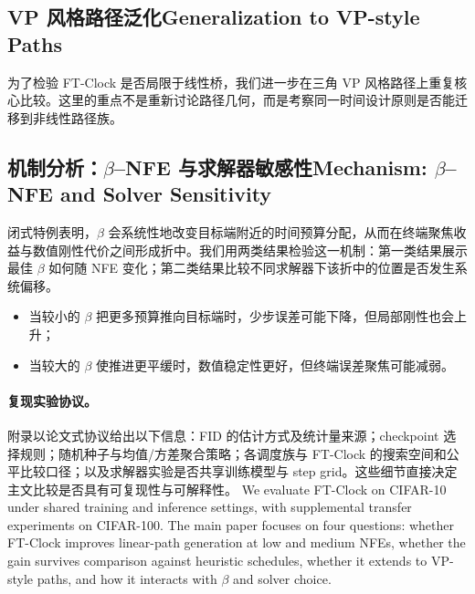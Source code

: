 \subsection{\ifinternalcn VP 风格路径泛化\else Generalization to VP-style Paths\fi}
为了检验 FT-Clock 是否局限于线性桥，我们进一步在三角 VP 风格路径上重复核心比较。这里的重点不是重新讨论路径几何，而是考察同一时间设计原则是否能迁移到非线性路径族。

\subsection{\ifinternalcn 机制分析：$\beta$--NFE 与求解器敏感性\else Mechanism: \texorpdfstring{$\beta$--NFE}{beta-NFE} and Solver Sensitivity\fi}
闭式特例表明，$\beta$ 会系统性地改变目标端附近的时间预算分配，从而在终端聚焦收益与数值刚性代价之间形成折中。我们用两类结果检验这一机制：第一类结果展示最佳 $\beta$ 如何随 NFE 变化；第二类结果比较不同求解器下该折中的位置是否发生系统偏移。
\begin{itemize}[leftmargin=1.5em]
  \item 当较小的 $\beta$ 把更多预算推向目标端时，少步误差可能下降，但局部刚性也会上升；
  \item 当较大的 $\beta$ 使推进更平缓时，数值稳定性更好，但终端误差聚焦可能减弱。
\end{itemize}


\paragraph{复现实验协议。}
附录以论文式协议给出以下信息：FID 的估计方式及统计量来源；checkpoint 选择规则；随机种子与均值/方差聚合策略；各调度族与 FT-Clock 的搜索空间和公平比较口径；以及求解器实验是否共享训练模型与 step grid。这些细节直接决定主文比较是否具有可复现性与可解释性。
\else
We evaluate FT-Clock on CIFAR-10 under shared training and inference settings, with supplemental transfer experiments on CIFAR-100. The main paper focuses on four questions: whether FT-Clock improves linear-path generation at low and medium NFEs, whether the gain survives comparison against heuristic schedules, whether it extends to VP-style paths, and how it interacts with $\beta$ and solver choice.

